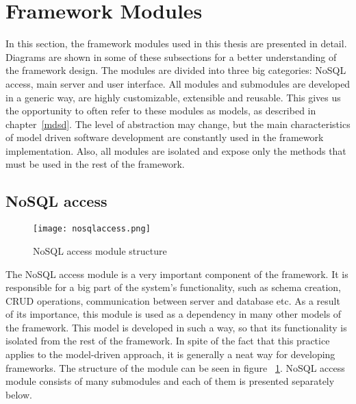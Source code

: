 \section{Framework Modules}
\label{modules}
In this section, the framework modules used in this thesis are presented in detail. Diagrams are shown in some of these subsections for a better understanding of the framework design. The modules are divided into three big categories: NoSQL access, main server and user interface. All modules and submodules are developed in a generic way, are highly customizable, extensible and reusable. This gives us the opportunity to often refer to these modules as models, as described in chapter~\ref{mdsd}. The level of abstraction may change, but the main characteristics of model driven software development are constantly used in the framework implementation. Also, all modules are isolated and expose only the methods that must be used in the rest of the framework.


\subsection{NoSQL access}
\label{nosql}
\begin{figure}
	\centerline{\texttt{[image: nosqlaccess.png]}}
	\caption{NoSQL access module structure}
	\label{nosqlaccess}
\end{figure}
The NoSQL access module is a very important component of the framework. It is responsible for a big part of the system's functionality, such as schema creation, CRUD operations, communication between server and database etc. As a result of its importance, this module is used as a dependency in many other models of the framework. This model is developed in such a way, so that its functionality is isolated from the rest of the framework. In spite of the fact that this practice applies to the model-driven approach, it is generally a neat way for developing frameworks. The structure of the module can be seen in figure ~\ref{nosqlaccess}. NoSQL access module consists of many submodules and each of them is presented separately below. 


